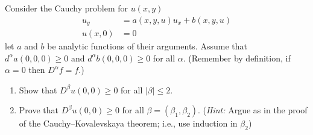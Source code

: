 \begin{problem}
  Consider the Cauchy problem for \(u(x,y)\)
  \begin{align*}
    u_y&=a(x, y, u)u_x+b(x,y,u)\\
    u(x,0)&=0
  \end{align*}
  let \(a\) and \(b\) be analytic functions of their arguments. Assume that
  \(d^\alpha a(0,0,0)\geq 0\) and \(d^\alpha b(0,0,0)\geq 0\) for all
  \(\alpha\). (Remember by definition, if \(\alpha=0\) then
  \(D^\alpha f=f\).)
  \begin{enumerate}[label=(\alph*),noitemsep]
  \item Show that \(D^\beta u(0,0)\geq 0\) for all \(|\beta|\leq 2\).
  \item Prove that \(D^\beta u(0,0)\geq 0\) for all
    \(\beta=(\beta_1,\beta_2)\). (\emph{Hint:} Argue as in the proof of the
    Cauchy--Kovalevskaya theorem; i.e., use induction in \(\beta_2\))
  \end{enumerate}
\end{problem}
